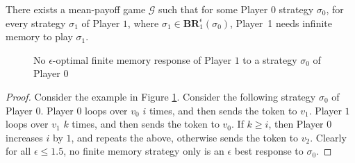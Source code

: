 \begin{theorem}
\label{ThmP1NeedInfMem}
There exists a mean-payoff game $\mathcal{G}$ such that for some Player $0$ strategy $\sigma_0$, for every strategy $\sigma_1$ of Player $1$, where $\sigma_1 \in \mathbf{BR}_1^{\epsilon}(\sigma_0)$, Player~1 needs infinite memory to play $\sigma_1$.
\end{theorem}
\begin{figure}
    \centering
    \caption{No $\epsilon$-optimal finite memory response of Player $1$ to a strategy $\sigma_0$ of Player $0$}
    \label{fig:no_optimal_response}
\end{figure}
\begin{proof}
Consider the example in Figure \ref{fig:no_optimal_response}.
Consider the following strategy $\sigma_0$ of Player $0$.
Player $0$ loops over $v_0$ $i$ times, and then sends the token to $v_1$.
Player $1$ loops over $v_1$ $k$ times, and then sends the token to $v_0$.
If $k \geqslant i$, then Player $0$ increases $i$ by $1$, and repeats the above, otherwise sends the token to $v_2$.
Clearly for all $\epsilon \leqslant 1.5$, no finite memory strategy only is an $\epsilon$ best response to $\sigma_0$.
\end{proof}